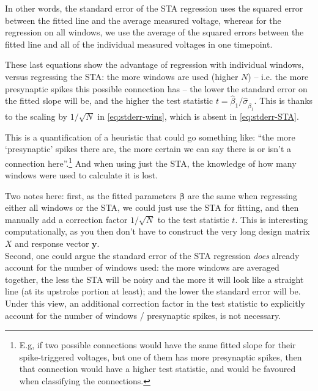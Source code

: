 In other words, the standard error of the STA regression uses the squared error between the fitted line and the average measured voltage, whereas for the regression on all windows, we use the average of the squared errors between the fitted line and all of the individual measured voltages in one timepoint.

These last equations show the advantage of regression with individual windows, versus regressing the STA: the more windows are used (higher $N$) -- i.e. the more presynaptic spikes this possible connection has -- the lower the standard error on the fitted slope will be, and the higher the test statistic $t = \hat{β}_1 / \hat{σ}_{\hat{β}_1}$. This is thanks to the scaling by $1 / \sqrt{N}$ in \cref{eq:stderr-wins}, which is absent in \cref{eq:stderr-STA}.

This is a quantification of a heuristic that could go something like: ``the more `presynaptic' spikes there are, the more certain we can say there is or isn't a connection here''.\footnote{
    E.g, if two possible connections would have the same fitted slope for their spike-triggered voltages, but one of them has more presynaptic spikes, then that connection would have a higher test statistic, and would be favoured when classifying the connections.
} And when using just the STA, the knowledge of how many windows were used to calculate it is lost.

Two notes here: first, as the fitted parameters $\bm{β}$ are the same when regressing either all windows or the STA, we could just use the STA for fitting, and then manually add a correction factor $1 / \sqrt{N}$ to the test statistic $t$. This is interesting computationally, as you then don't have to construct the very long design matrix $X$ and response vector $\bm{y}$.\\
Second, one could argue the standard error of the STA regression \emph{does} already account for the number of windows used: the more windows are averaged together, the less the STA will be noisy and the more it will look like a straight line (at its upstroke portion at least); and the lower the standard error will be. Under this view, an additional correction factor in the test statistic to explicitly account for the number of windows / presynaptic spikes, is not necessary.





